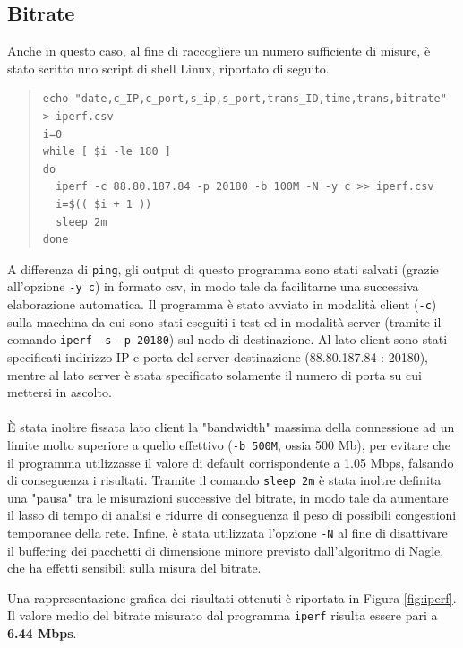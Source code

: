 \documentclass[a4paper,10pt]{article}
\begin{document}
\subsection{Bitrate}
Anche in questo caso, al fine di raccogliere un numero sufficiente di misure, è stato scritto uno script di shell Linux, riportato di seguito.
\small
\begin{quote}
\begin{verbatim}
echo "date,c_IP,c_port,s_ip,s_port,trans_ID,time,trans,bitrate" > iperf.csv
i=0
while [ $i -le 180 ]
do
  iperf -c 88.80.187.84 -p 20180 -b 100M -N -y c >> iperf.csv
  i=$(( $i + 1 ))
  sleep 2m
done
\end{verbatim}
\end{quote}
\normalsize
A differenza di \texttt{ping}, gli output di questo programma sono stati salvati (grazie all'opzione \texttt{-y c}) in formato csv, in modo tale da facilitarne una successiva elaborazione automatica. Il programma è stato avviato in modalità client (\texttt{-c}) sulla macchina da cui sono stati eseguiti i test ed in modalità server (tramite il comando \texttt{iperf -s -p 20180}) sul nodo di destinazione. Al lato client sono stati specificati indirizzo IP e porta del server destinazione (88.80.187.84 : 20180), mentre al lato server è stata specificato solamente il numero di porta su cui mettersi in ascolto.\\\\
È stata inoltre fissata lato client la "bandwidth" massima della connessione ad un limite molto superiore a quello effettivo (\texttt{-b 500M}, ossia 500 Mb), per evitare che il programma utilizzasse il valore di default corrispondente a 1.05 Mbps, falsando di conseguenza i risultati. Tramite il comando \texttt{sleep 2m} è stata inoltre definita una "pausa" tra le misurazioni successive del bitrate, in modo tale da aumentare il lasso di tempo di analisi e ridurre di conseguenza il peso di possibili congestioni temporanee della rete. Infine, è stata utilizzata l'opzione \texttt{-N} al fine di disattivare il buffering dei pacchetti di dimensione minore previsto dall'algoritmo di Nagle, che ha effetti sensibili sulla misura del bitrate.
\newpage

\noindent
Una rappresentazione grafica dei risultati ottenuti è riportata in Figura \ref{fig:iperf}. Il valore medio del bitrate misurato dal programma \texttt{iperf} risulta essere pari a \textbf{6.44 Mbps}.\\
\end{document}
